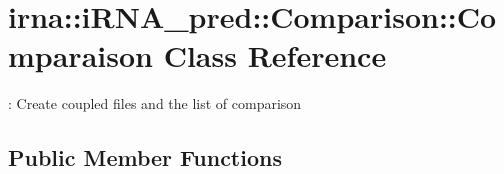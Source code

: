 \hypertarget{classirna_1_1iRNA__pred_1_1Comparison_1_1Comparaison}{
\section{irna\-:\-:i\-R\-N\-A\-\_\-pred\-:\-:\-Comparison\-:\-:\-Comparaison \-Class \-Reference}
\label{classirna_1_1iRNA__pred_1_1Comparison_1_1Comparaison}
}


\-: \-Create coupled files and the list of comparison  


\subsection*{\-Public \-Member \-Functions}

